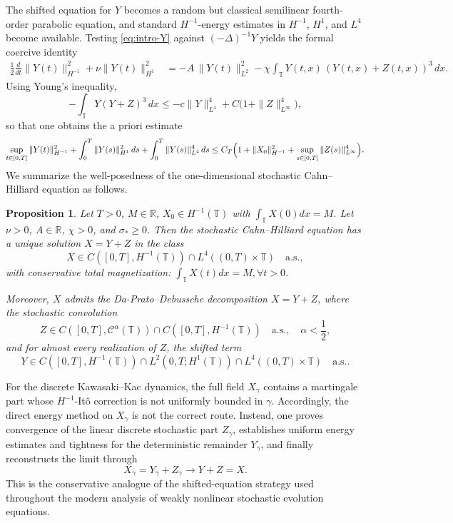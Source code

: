 \documentclass{article}
\newtheorem{proposition}[theorem]{Proposition}
\begin{document}
The shifted equation for \(Y\) becomes a random but classical semilinear fourth-order parabolic equation, and standard \(H^{-1}\)-energy estimates in \(H^{-1}\), \(H^{1}\), and \(L^4\) become available. 
Testing \eqref{eq:intro-Y} against \((-\Delta)^{-1}Y\) yields the formal coercive identity
\begin{align}
\frac12\frac{d}{dt}\|Y(t)\|_{H^{-1}}^2
+\nu \|Y(t)\|_{H^1}^2
&=
- A\,\|Y(t)\|_{L^2}^2
- \chi\int_{\mathbb T} Y(t,x)\,(Y(t,x)+Z(t,x))^3\,dx.
\label{eq:intro-energy}
\end{align}
Using Young's inequality,
\[
-\int_{\mathbb T}Y(Y+Z)^3\,dx
\le
-c\|Y\|_{L^4}^4
+
C\bigl(1+\|Z\|_{L^\infty}^4\bigr),
\]
so that one obtains the a priori estimate
\begin{equation}
\label{eq:intro-Y-est}
\sup_{t\in[0,T]}\|Y(t)\|_{H^{-1}}^2
+
\int_0^T \|Y(s)\|_{H^1}^2\,ds
+
\int_0^T \|Y(s)\|_{L^4}^4\,ds
\le
C_T\Bigl(1+\|X_0\|_{H^{-1}}^2+\sup_{s\in[0,T]}\|Z(s)\|_{L^\infty}^4\Bigr).
\end{equation}
We summarize the well-posedness of the one-dimensional stochastic Cahn--Hilliard equation as follows.

\begin{proposition}\label{thm:wellposedness-SCH-1d}
Let \(T>0\), $M \in \mathbb R$, \(X_0\in H^{-1}(\mathbb T)\) with $\int_{\mathbb T} X(0) dx = M$. Let $\nu>0$, $A\in\mathbb R$, $\chi >0$, and $\sigma_*\ge0$.
Then the stochastic Cahn--Hilliard equation has a unique solution \(X=Y+Z\) in the class
\[
X\in
C([0,T],H^{-1}(\mathbb T))
\cap
L^4((0,T)\times\mathbb T)
\quad\text{a.s.},
\]
with conservative total magnetization: $\int_{\mathbb T} X(t) dx = M, \forall t >0$.

Moreover, $X$ admits the Da-Prato–Debussche decomposition $X=Y+Z$, where the stochastic convolution
\[
Z\in C([0,T],\mathcal C^\alpha(\mathbb T))\cap C([0,T],H^{-1}(\mathbb T))
\quad\text{a.s.}, \quad\alpha<\frac12,
\]
and for almost every realization of \(Z\), the shifted term
\[
Y\in
C([0,T],H^{-1}(\mathbb T))
\cap
L^2(0,T;H^1(\mathbb T))
\cap
L^4((0,T)\times\mathbb T)
\quad\text{a.s.}.
\]
\end{proposition}

For the discrete Kawasaki--Kac dynamics, the full field \(X_\gamma\) contains a martingale part
whose \(H^{-1}\)-It\^o correction is not uniformly bounded in \(\gamma\).
Accordingly, the direct energy method on \(X_\gamma\) is not the correct route.
Instead, one proves convergence of the linear discrete stochastic part \(Z_\gamma\),
establishes uniform energy estimates and tightness for the deterministic remainder \(Y_\gamma\),
and finally reconstructs the limit through
\[
X_\gamma=Y_\gamma+Z_\gamma \rightarrow Y+Z=X.
\]
This is the conservative analogue of the shifted-equation strategy used throughout the modern analysis of weakly nonlinear stochastic evolution equations.
\end{document}
